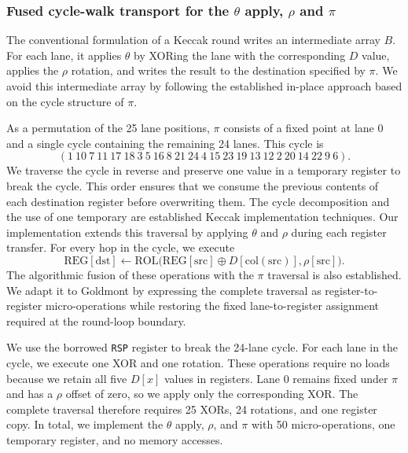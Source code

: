 \documentclass[journal=tches,submission]{iacrtrans}
\newcommand{\code}[1]{\texttt{#1}}
\begin{document}
\subsubsection{Fused cycle-walk transport for the $\theta$ apply, $\rho$ and $\pi$}
\label{sec:cyclewalk}

The conventional formulation of a Keccak round writes an intermediate array $B$. 
For each lane, it applies $\theta$ by XORing the lane with the corresponding $D$ value, applies the $\rho$ rotation, and writes the result to the destination specified by $\pi$. 
We avoid this intermediate array by following the established in-place approach based on the cycle structure of $\pi$.

As a permutation of the 25 lane positions, $\pi$ consists of a fixed point at lane 0 and a single cycle containing the remaining 24 lanes. 
This cycle is
\[
(1\ 10\ 7\ 11\ 17\ 18\ 3\ 5\ 16\ 8\ 21\ 24\ 4\ 15\ 23\ 19\ 13\ 12\ 2\ 20\ 14\ 22\ 9\ 6).
\]
We traverse the cycle in reverse and preserve one value in a temporary register to break the cycle. 
This order ensures that we consume the previous contents of each destination register before overwriting them. 
The cycle decomposition and the use of one temporary are established Keccak implementation techniques.
Our implementation extends this traversal by applying $\theta$ and $\rho$ during each register transfer. 
For every hop in the cycle, we execute
\[
\mathrm{REG}[\mathrm{dst}] \leftarrow
\mathrm{ROL}\bigl(\mathrm{REG}[\mathrm{src}] \oplus
D[\mathrm{col}(\mathrm{src})],\rho[\mathrm{src}]\bigr).
\]
The algorithmic fusion of these operations with the $\pi$ traversal is also established. 
We adapt it to Goldmont by expressing the complete traversal as register-to-register micro-operations while restoring the fixed lane-to-register assignment required at the round-loop boundary.

We use the borrowed \code{RSP} register to break the 24-lane cycle. 
For each lane in the cycle, we execute one XOR and one rotation. 
These operations require no loads because we retain all five $D[x]$ values in registers. 
Lane 0 remains fixed under $\pi$ and has a $\rho$ offset of zero, so we apply only the corresponding XOR. 
The complete traversal therefore requires 25 XORs, 24 rotations, and one register copy.
In total, we implement the $\theta$ apply, $\rho$, and $\pi$ with 50 micro-operations, one temporary register, and no memory accesses.
\end{document}
